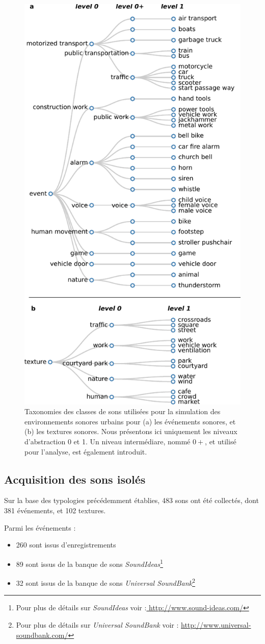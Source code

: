 \begin{figure}[t]
        \myfloatalign
        \includegraphics[width=.5\linewidth]{gfxHierarchy/taxonomy}
       \caption[Taxonomies des classes de sons utilisées pour la simulation des environnements sonores urbains]{Taxonomies des classes de sons utilisées pour la simulation des environnements sonores urbains pour (a) les événements sonores, et (b) les textures sonores. Nous présentons ici uniquement les niveaux d'abstraction 0 et 1. Un niveau intermédiare, nommé $0+$, et utilisé pour l'analyse, est également introduit.}\label{fig:taxonomie}
\end{figure}

\subsection{Acquisition des sons isolés}

Sur la base des typologies précédemment établies, 483 sons ont été collectés, dont 381 événements, et 102 textures.

Parmi les événements :

\begin{itemize}
\item 260 sont issus d’enregistrements
\item 89 sont issus de la banque de sons \emph{SoundIdeas}\footnote{Pour plus de détails sur \emph{SoundIdeas} voir :\url{ http://www.sound-ideas.com/}}
\item 32 sont issus de la banque de sons \emph{Universal SoundBank}\footnote{Pour plus de détails sur \emph{Universal SoundBank} voir : \url{http://www.universal-soundbank.com/}}
\end{itemize}

